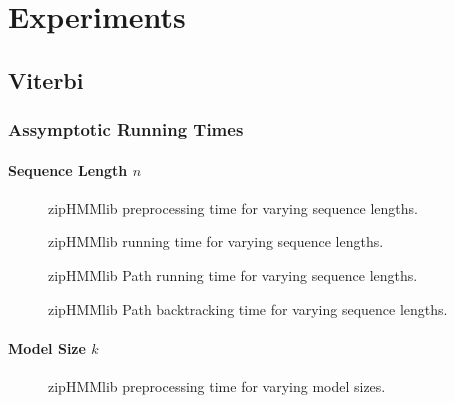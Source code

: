 \chapter{Experiments}
\label{cha:experiments}

\section{Viterbi}
\label{sec:viterbi}

\subsection{Assymptotic Running Times}
\label{sec:assymp-runn-times}

\subsubsection{Sequence Length $n$}
\label{sec:sequence-length-n}

\begin{figure}[H]
  \centering
  
  \caption{zipHMMlib preprocessing time for varying sequence lengths.}
  \label{fig:pre_viterbi_n}
\end{figure}

\begin{figure}[H]
  \centering
  
  \caption{zipHMMlib running time for varying sequence lengths.}
  \label{fig:assymptotic_viterbi_n}
\end{figure}

\begin{figure}[H]
  \centering
  
  \caption{zipHMMlib Path running time for varying sequence lengths.}
  \label{fig:assymptotic_viterbi_path_n}
\end{figure}

\begin{figure}[H]
  \centering
  
  \caption{zipHMMlib Path backtracking time for varying sequence lengths.}
  \label{fig:assymptotic_viterbi_backtrack_n}
\end{figure}

\subsubsection{Model Size $k$}
\label{sec:model-size-k}

\begin{figure}[H]
  \centering
  
  \caption{zipHMMlib preprocessing time for varying model sizes.}
  \label{fig:pre_viterbi_k}
\end{figure}

